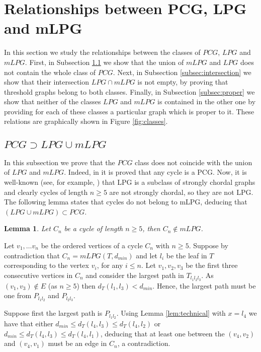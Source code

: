 \documentclass[dvipdfm]{llncs}
\newtheorem{Lemma}{Lemma}
\newcommand{\dmin}{d_{min}}
\begin{document}
\section{Relationships between PCG, LPG and mLPG  }\label{sec:relations}

In this section we study the relationships between the classes of $PCG$, $LPG$ and $mLPG$. First, in Subsection \ref{subsec:union} we show that the union of $mLPG$ and $LPG$ does not contain the whole class of $PCG$. Next, in Subsection \ref{subsec:intersection} we show that their intersection $LPG \cap mLPG$ is not empty, by proving that threshold graphs belong to both classes. Finally, in Subsection \ref{subsec:proper} we show that neither of the classes $LPG$ and $mLPG$ is contained in the other one by providing for each of these classes a particular graph which is proper to it. These relations are graphically shown in Figure \ref{fig:classes}. 



\subsection{$PCG \supset LPG \cup mLPG$} \label{subsec:union}
In this subsection we prove that the $PCG$ class does not coincide with the union of $LPG$ and $mLPG$. Indeed, in \cite{YHR09} it is proved that any cycle is a PCG. Now, it is well-known (see, for example, \cite{B}) that LPG is a subclass of strongly chordal graphs and clearly cycles of length $n \geq 5$ are not strongly chordal, so they are not LPG. The following lemma states that cycles do not belong to mLPG, deducing that $(LPG \cup mLPG) \subset PCG$.

\begin{Lemma}
Let $C_n$ be a cycle of length $n \geq 5$, then $C_n \not \in mLPG$.
\end{Lemma}
\proof
Let $v_1, \ldots v_n$ be the ordered vertices of a cycle $C_n$ with $n \geq 5$. Suppose by contradiction that $C_n=mLPG (T,\dmin)$ and let $l_i$
be the leaf in $T$ corresponding to the vertex $v_i$, for any $i \leq n$.  Let $v_1, v_2, v_3$ be the first three consecutive vertices in $C_n$ and consider the largest path in $T_{l_1 l_2 l_3}$. As $(v_1,v_3) \not\in E$ (as $n\geq 5 $) then $d_T(l_1,l_3) < \dmin$. Hence, the largest path must be one from $P_{l_1 l_2}$ and $P_{l_2 l_3}$. 

Suppose first the largest path is $P_{l_1 l_2}$. Using Lemma \ref{lem:technical} with $x=l_4$ we have that either $\dmin \leq d_T(l_4,l_3) \leq d_T(l_4,l_2)$ or $\dmin \leq d_T(l_4,l_3) \leq d_T(l_4,l_1)$, deducing that at least one between the $(v_4,v_2)$ and $(v_4,v_1)$ must be an edge in $C_n$, a contradiction. 
\end{document}
